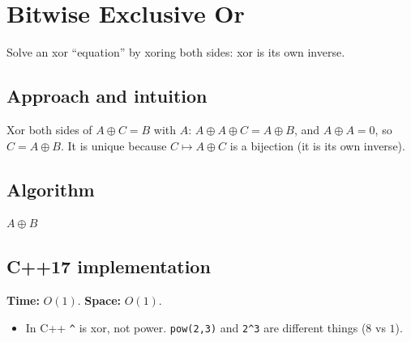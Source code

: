 \section{Bitwise Exclusive Or}
\label{sec:b-xor-basic}


\begin{patternbox}
Solve an xor ``equation'' by xoring both sides: xor is its own inverse.
\end{patternbox}

\subsection*{Approach and intuition}

Xor both sides of $A\oplus C=B$ with $A$:
$A\oplus A\oplus C=A\oplus B$, and $A\oplus A=0$, so $C=A\oplus B$. It is
unique because $C\mapsto A\oplus C$ is a bijection (it is its own inverse).

\subsection*{Algorithm}
\begin{algorithmic}[1]
\State \Return $A\oplus B$
\end{algorithmic}


\subsection*{C++17 implementation}

\begin{complexitybox}
\textbf{Time:} $O(1)$. \textbf{Space:} $O(1)$.
\end{complexitybox}

\begin{pitfallbox}
\begin{itemize}
  \item In C++ \texttt{\^{}} is xor, not power. \texttt{pow(2,3)} and
        \texttt{2\^{}3} are different things ($8$ vs $1$).
\end{itemize}
\end{pitfallbox}
